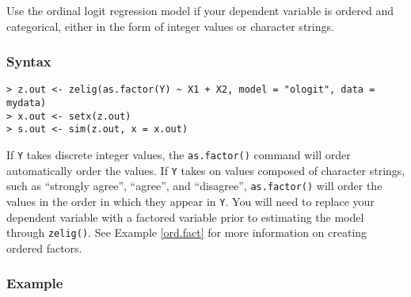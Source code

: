 \documentclass{article}
\begin{document}
Use the ordinal logit regression model if your dependent variable is
ordered and categorical, either in the form of integer values or character strings.  

\subsubsection{Syntax}

\begin{verbatim}
> z.out <- zelig(as.factor(Y) ~ X1 + X2, model = "ologit", data = mydata)
> x.out <- setx(z.out)
> s.out <- sim(z.out, x = x.out)
\end{verbatim}
If {\tt Y} takes discrete integer values, the {\tt as.factor()}
command will order automatically order the values.  If {\tt Y} takes
on values composed of character strings, such as ``strongly agree'',
``agree'', and ``disagree'', {\tt as.factor()} will order the values
in the order in which they appear in {\tt Y}.  You will need to
replace your dependent variable with a factored variable prior to
estimating the model through {\tt zelig()}.  See Example
\ref{ord.fact} for more information on creating ordered factors.

\subsubsection{Example}
\end{document}
